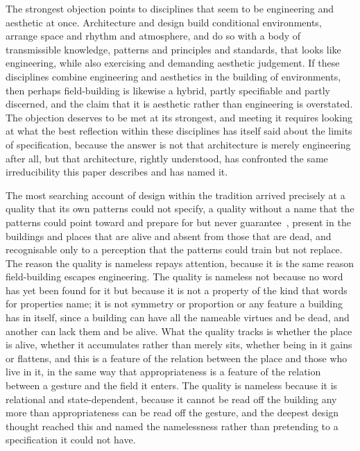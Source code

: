 The strongest objection points to disciplines that seem to be engineering and aesthetic at once. Architecture and design build conditional environments, arrange space and rhythm and atmosphere, and do so with a body of transmissible knowledge, patterns and principles and standards, that looks like engineering, while also exercising and demanding aesthetic judgement. If these disciplines combine engineering and aesthetics in the building of environments, then perhaps field-building is likewise a hybrid, partly specifiable and partly discerned, and the claim that it is aesthetic rather than engineering is overstated. The objection deserves to be met at its strongest, and meeting it requires looking at what the best reflection within these disciplines has itself said about the limits of specification, because the answer is not that architecture is merely engineering after all, but that architecture, rightly understood, has confronted the same irreducibility this paper describes and has named it.

The most searching account of design within the tradition arrived precisely at a quality that its own patterns could not specify, a quality without a name that the patterns could point toward and prepare for but never guarantee~\parencite{alexander_timeless}, present in the buildings and places that are alive and absent from those that are dead, and recognisable only to a perception that the patterns could train but not replace. The reason the quality is nameless repays attention, because it is the same reason field-building escapes engineering. The quality is nameless not because no word has yet been found for it but because it is not a property of the kind that words for properties name; it is not symmetry or proportion or any feature a building has in itself, since a building can have all the nameable virtues and be dead, and another can lack them and be alive. What the quality tracks is whether the place is alive, whether it accumulates rather than merely sits, whether being in it gains or flattens, and this is a feature of the relation between the place and those who live in it, in the same way that appropriateness is a feature of the relation between a gesture and the field it enters. The quality is nameless because it is relational and state-dependent, because it cannot be read off the building any more than appropriateness can be read off the gesture, and the deepest design thought reached this and named the namelessness rather than pretending to a specification it could not have.

